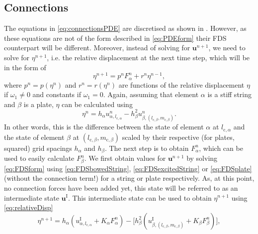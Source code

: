 \documentclass{article}
\begin{document}
\subsection{Connections}
The equations in \eqref{eq:connectionsPDE} are discretised as shown in \cite{Bilbao2009:ModularPercussion}. However, as these equations are not of the form described in \eqref{eq:PDEform} their FDS counterpart will be different. Moreover, instead of solving for $\mathbf{u}^{n+1}$, we need to solve for $\eta^{n+1}$, i.e. the relative displacement at the next time step, which will be in the form of
\begin{equation}\label{eq:etaNext}
    \eta^{n+1} = p^nF_\alpha^n + r^n\eta^{n-1},
\end{equation}
where $p^n = p(\eta^n)$ and $r^n = r(\eta^n)$ are functions of the relative displacement $\eta$ if $\omega_1 \neq 0$ and constants if $\omega_1 = 0$. Again, assuming that element $\alpha$ is a stiff string and $\beta$ is a plate, $\eta$ can be calculated using
\begin{equation}\label{eq:relativeDisp}
    \eta^n = h_\alpha u_{\alpha, l_{\text{c},\alpha}}^n - h_\beta^2 u_{\beta,(l_{\text{c},\beta}, m_{\text{c},\beta})}^n.
\end{equation}
In other words, this is the difference between the state of element $\alpha$ at $l_{\text{c},\alpha}$ and the state of element $\beta$ at $(l_{\text{c},\beta}, m_{\text{c},\beta})$ scaled by their respective (for plates, squared) grid spacings $h_\alpha$ and $h_\beta$. %
The next step is to obtain $F^n_\alpha$, which can be used to easily calculate $F^n_\beta$. We first obtain values for $\mathbf{u}^{n+1}$ by solving \eqref{eq:FDSform} using \eqref{eq:FDSbowedString}, \eqref{eq:FDSexcitedString} or \eqref{eq:FDSplate} (without the connection term!) for a string or plate respectively. As, at this point, no connection forces have been added yet, this state will be referred to as an intermediate state $\mathbf{u}^\text{I}$. This intermediate state can be used to obtain $\eta^{n+1}$ using \eqref{eq:relativeDisp}
\begin{equation}
    \eta^{n+1} = h_\alpha( u_{\alpha,l_{\text{c},\alpha}}^\text{I} + K_\alpha F^n_\alpha) - \Big[h^2_\beta( u_{\beta,(l_{\text{c},\beta}, m_{\text{c},\beta})}^\text{I} 
    + K_\beta F^n_\beta)\Big],
\end{equation}
\end{document}
